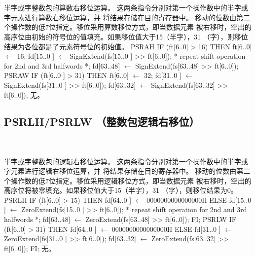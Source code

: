 \begin{instructionblk}
   \\
   \\
  {半字或字整数包的算数右移位运算。}
  {这两条指令分别对第一个操作数中的半字或字元素进行算数右移位运算，并
  将结果存储在目的寄存器中。
  移动的位数由第二个操作数的低7位指定。移位采用算数移位方式，即当数据元素
  被右移时，空出的高序位由初始的符号位的值填充。如果移位值大于15（半字），31
  （字），则移位结果为各位都是了元素符号位的初始值。}
  {PSRAH \narrownewline
  IF (ft[6..0] > 16) THEN ft[6..0] $\leftarrow$ 16; \narrownewline
  fd[15..0 ] $\leftarrow$ SignExtend(fs[15..0 ] >> ft[6..0]); \narrownewline
  * repeat shift operation for 2nd and 3rd halfwords *; \narrownewline
  fd[63..48] $\leftarrow$ SignExtend(fs[63..48] >> ft[6..0]); \narrownewline \narrownewline
  PSRAW \narrownewline
  IF (ft[6..0 ] > 31) THEN ft[6..0] $\leftarrow$ 32; \narrownewline
  fd[31..0 ] $\leftarrow$ SignExtend(fs[31..0 ] >> ft[6..0]); \narrownewline
  fd[63..32] $\leftarrow$ SignExtend(fs[63..32] >> ft[6..0]);}
  {无。}
\end{instructionblk}

\subsection{PSRLH/PSRLW （整数包逻辑右移位）}

\begin{instructionblk}
   \\
   \\
  {半字或字整数包的逻辑右移位运算。}
  {这两条指令分别对第一个操作数中的半字或字元素进行逻辑右移位运算，并
  将结果存储在目的寄存器中。
  移动的位数由第二个操作数的低7位指定。移位采用逻辑移位方式，即当数据元素
  被右移时，空出的高序位将被零填充。如果移位值大于15（半字），31
  （字），则移位结果为0。}
  {PSRLH \narrownewline
  IF (ft[6..0] > 15) \narrownewline
  THEN \narrownewline
  \mbox{\hspace{.5cm}} fd[64..0 ] $\leftarrow$ 0000000000000000H \narrownewline
  ELSE \narrownewline
  \mbox{\hspace{.5cm}} fd[15..0 ] $\leftarrow$ ZeroExtend(fs[15..0 ] >> ft[6..0]); \narrownewline
  \mbox{\hspace{.5cm}} * repeat shift operation for 2nd and 3rd halfwords *; \narrownewline
  \mbox{\hspace{.5cm}} fd[63..48] $\leftarrow$ ZeroExtend(fs[63..48] >> ft[6..0]); \narrownewline
  FI; \narrownewline \narrownewline
  PSRLW \narrownewline
  IF (ft[6..0] > 31) \narrownewline
  THEN \narrownewline
  \mbox{\hspace{.5cm}} fd[64..0 ] $\leftarrow$ 0000000000000000H \narrownewline
  ELSE \narrownewline
  \mbox{\hspace{.5cm}} fd[31..0 ] $\leftarrow$ ZeroExtend(fs[31..0 ] >> ft[6..0]); \narrownewline
  \mbox{\hspace{.5cm}} fd[63..32] $\leftarrow$ ZeroExtend(fs[63..32] >> ft[6..0]); \narrownewline
  FI;}
  {无。}
\end{instructionblk}

